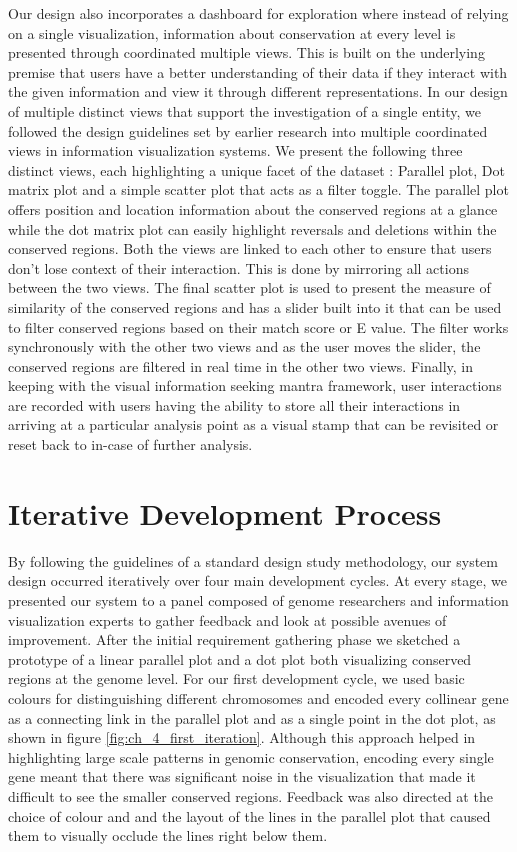 Our design also incorporates a dashboard for exploration where instead of relying on a single visualization, information about conservation at every level is presented through coordinated multiple views. This is built on the underlying premise that users have a better understanding of their data if they interact with the given information and view it through different representations\cite{Roberts}. In our design of multiple distinct views that support the investigation of a single entity, we followed the design guidelines set by earlier research into multiple coordinated views in information visualization systems\cite{WangBaldonado}. We present the following three distinct views, each highlighting a unique facet of the dataset : Parallel plot, Dot matrix plot and a simple scatter plot that acts as a filter toggle. The parallel plot offers position and location information about the conserved regions at a glance while the dot matrix plot can easily highlight reversals and deletions within the conserved regions. Both the views are linked to each other to ensure that users don't lose context of their interaction. This is done by mirroring all actions between the two views. The final scatter plot is used to present the measure of similarity of the conserved regions and has a slider built into it that can be used to filter conserved regions based on their match score or E value. The filter works synchronously with the other two views and as the user moves the slider, the conserved regions are filtered in real time in the other two views. Finally, in keeping with the visual information seeking mantra framework, user interactions are recorded with users having the ability to store all their interactions in arriving at a particular analysis point as a visual stamp that can be revisited or reset back to in-case of further analysis.

\section{Iterative Development Process}
By following the guidelines of a standard design study methodology\cite{5290695}, our system design occurred iteratively over four main development cycles. At every stage, we presented our system to a panel composed of genome researchers and information visualization experts to gather feedback and look at possible avenues of improvement. After the initial requirement gathering phase we sketched a prototype of a linear parallel plot and a dot plot both visualizing conserved regions at the genome level. For our first development cycle, we used basic colours for distinguishing different chromosomes and encoded every collinear gene as a connecting link in the parallel plot and as a single point in the dot plot, as shown in figure \ref{fig:ch_4_first_iteration}. Although this approach helped in highlighting large scale patterns in genomic conservation, encoding every single gene meant that there was significant noise in the visualization that made it difficult to see the smaller conserved regions. Feedback was also directed at the choice of colour and and the layout of the lines in the parallel plot that caused them to visually occlude the lines right below them.

